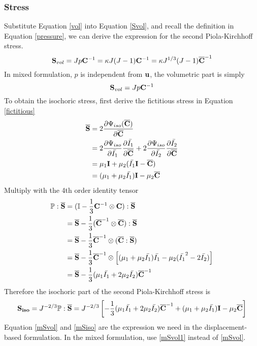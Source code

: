 \subsubsection{Stress}
Substitute Equation \ref{vol} into Equation \ref{Svol}, and recall the definition in Equation \ref{pressure}, we can derive the expression for the second Piola-Kirchhoff stress.
\begin{equation} \label{mSvol}
\bold{S}_{vol} = Jp\bold{C}^{-1} = \kappa{J(J-1)}\bold{C}^{-1} = \kappa{J^{1/3}(J-1)}\bold{\overline{C}}^{-1}
\end{equation}
In mixed formulation, $p$ is independent from $\bold{u}$, the volumetric part is simply
\begin{equation} \label{mSvol1}
\bold{S}_{vol} = Jp\bold{C}^{-1}
\end{equation}
To obtain the isochoric stress, first derive the fictitious stress in Equation \ref{fictitious}
\begin{equation} \label{mfictitious}
\begin{split}
\overline{\bold{S}} &= 2\frac{\partial\Psi_{iso}({\overline{\bold{C}})}}{\partial\overline{\bold{C}}} \\
&= 2\frac{\partial\Psi_{iso}}{\partial\bar{I_1}} \frac{\partial\bar{I_1}}{\partial\overline{\bold{C}}}  + 2\frac{\partial\Psi_{iso}}{\partial\bar{I_2}} \frac{\partial\bar{I_2}}{\partial\overline{\bold{C}}} \\
&= \mu_1{\bold{I}} + \mu_2({\bar{I_1}\bold{I} - \overline{\bold{C}}}) \\
&= (\mu_1+\mu_2\bar{I_1})\bold{I} - \mu_2{\overline{\bold{C}}}
\end{split}
\end{equation}
Multiply with the 4th order identity tensor
\begin{equation}
\begin{split}
\mathbb{P}:\overline{\bold{S}} &= ( \mathbb{I} - \frac{1}{3}\bold{C}^{-1} \otimes \bold{C} ) : \overline{\bold{S}} \\
&= \overline{\bold{S}} - \frac{1}{3}( \overline{\bold{C}}^{-1} \otimes \overline{\bold{C}} ) : \overline{\bold{S}} \\
&= \overline{\bold{S}} - \frac{1}{3} \overline{\bold{C}}^{-1} \otimes (\overline{\bold{C}} : \overline{\bold{S}}) \\
&= \overline{\bold{S}} - \frac{1}{3} \overline{\bold{C}}^{-1} \otimes \left[(\mu_1+\mu_2\bar{I_1})\bar{I_1} - \mu_2(\bar{I_1}^2-2\bar{I_2})\right]\\
&= \overline{\bold{S}} -  \frac{1}{3}(\mu_1\bar{I_1} + 2\mu_2\bar{I_2}) \overline{\bold{C}}^{-1} 
\end{split}
\end{equation}
Therefore the isochoric part of the second Piola-Kirchhoff stress is
\begin{equation} \label{mSiso}
\bold{S_{iso}} = J^{-2/3}\mathbb{P}:\overline{\bold{S}} = J^{-2/3}\left[    - \frac{1}{3}(\mu_1\bar{I_1} + 2\mu_2\bar{I_2}) \overline{\bold{C}}^{-1}  + (\mu_1 + \mu_2\bar{I_1})\bold{I} - \mu_2\overline{\bold{C}} \right]
\end{equation}
Equation \ref{mSvol} and \ref{mSiso} are the expression we need in the displacement-based formulation. In the mixed formulation, use \ref{mSvol1} instead of \ref{mSvol}.

